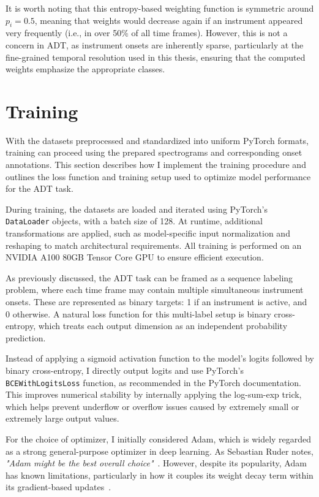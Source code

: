 It is worth noting that this entropy-based weighting function is symmetric around $p_i = 0.5$, meaning that weights would decrease again if an instrument appeared very frequently (i.e., in over 50\% of all time frames). However, this is not a concern in \gls{ADT}, as instrument onsets are inherently sparse, particularly at the fine-grained temporal resolution used in this thesis, ensuring that the computed weights emphasize the appropriate classes.

\section{Training}

With the datasets preprocessed and standardized into uniform PyTorch formats, training can proceed using the prepared spectrograms and corresponding onset annotations. This section describes how I implement the training procedure and outlines the loss function and training setup used to optimize model performance for the \gls{ADT} task.

During training, the datasets are loaded and iterated using PyTorch's \texttt{DataLoader} objects, with a batch size of 128. At runtime, additional transformations are applied, such as model-specific input normalization and reshaping to match architectural requirements. All training is performed on an NVIDIA A100 80GB Tensor Core GPU to ensure efficient execution.

As previously discussed, the \gls{ADT} task can be framed as a sequence labeling problem, where each time frame may contain multiple simultaneous instrument onsets. These are represented as binary targets: 1 if an instrument is active, and 0 otherwise. A natural loss function for this multi-label setup is binary cross-entropy, which treats each output dimension as an independent probability prediction. 

Instead of applying a sigmoid activation function to the model's logits followed by binary cross-entropy, I directly output logits and use PyTorch's \texttt{BCEWithLogitsLoss} function, as recommended in the PyTorch documentation. This improves numerical stability by internally applying the log-sum-exp trick, which helps prevent underflow or overflow issues caused by extremely small or extremely large output values.

For the choice of optimizer, I initially considered Adam, which is widely regarded as a strong general-purpose optimizer in deep learning. As Sebastian Ruder notes, \textit{"Adam might be the best overall choice"}~\cite{ruder2017overviewgradientdescentoptimization}. However, despite its popularity, Adam has known limitations, particularly in how it couples its weight decay term within its gradient-based updates~\cite{kingma2017adammethodstochasticoptimization, bock2018improvementconvergenceproofadamoptimizer}.

